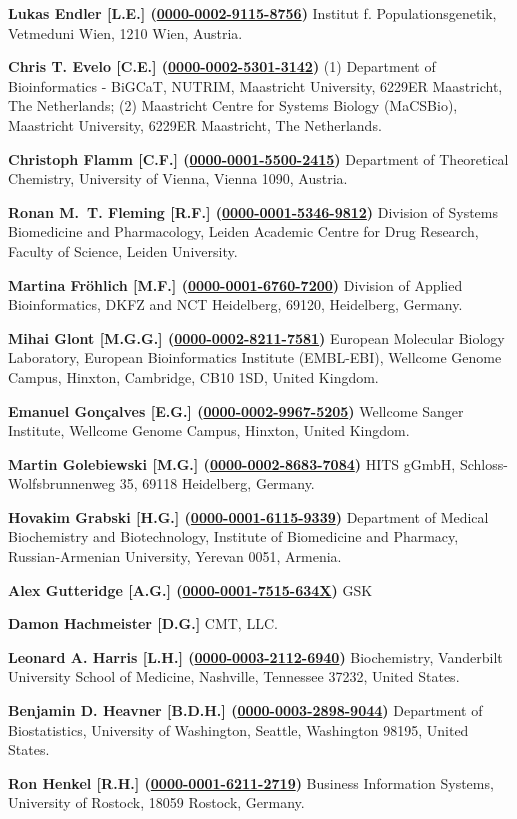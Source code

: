 \documentclass{sbml-paper}
\newcommand{\orcid}[1]{\href{https://orcid.org/#1}{#1}}
\begin{document}
\textbf{Lukas Endler [L.E.] (\orcid{0000-0002-9115-8756})} Institut f. Populationsgenetik, Vetmeduni  Wien, 1210 Wien, Austria.

\textbf{Chris T. Evelo [C.E.] (\orcid{0000-0002-5301-3142})} (1) Department of Bioinformatics - BiGCaT, NUTRIM, Maastricht University, 6229ER Maastricht, The Netherlands; (2) Maastricht Centre for Systems Biology (MaCSBio), Maastricht University, 6229ER Maastricht, The Netherlands.

\textbf{Christoph Flamm [C.F.] (\orcid{0000-0001-5500-2415})} Department of Theoretical Chemistry, University of Vienna, Vienna 1090, Austria.

\textbf{Ronan M.~T. Fleming [R.F.] (\orcid{0000-0001-5346-9812})} Division of Systems Biomedicine and Pharmacology, Leiden Academic Centre for Drug Research, Faculty of Science, Leiden University.

\textbf{Martina Fröhlich [M.F.] (\orcid{0000-0001-6760-7200})} Division of Applied Bioinformatics, DKFZ and NCT Heidelberg, 69120, Heidelberg, Germany.

\textbf{Mihai Glont [M.G.G.] (\orcid{0000-0002-8211-7581})} European Molecular Biology Laboratory, European Bioinformatics Institute (EMBL-EBI), Wellcome Genome Campus, Hinxton, Cambridge, CB10 1SD, United Kingdom.

\textbf{Emanuel Gonçalves [E.G.] (\orcid{0000-0002-9967-5205})} Wellcome Sanger Institute, Wellcome Genome Campus, Hinxton, United Kingdom.

\textbf{Martin Golebiewski [M.G.] (\orcid{0000-0002-8683-7084})} HITS gGmbH, Schloss-Wolfsbrunnenweg 35, 69118 Heidelberg, Germany.

\textbf{Hovakim Grabski [H.G.] (\orcid{0000-0001-6115-9339})} Department of Medical Biochemistry and Biotechnology, Institute of Biomedicine and Pharmacy, Russian-Armenian University, Yerevan 0051, Armenia.

\textbf{Alex Gutteridge [A.G.] (\orcid{0000-0001-7515-634X})} GSK

\textbf{Damon Hachmeister [D.G.]} CMT, LLC.

\textbf{Leonard A. Harris [L.H.] (\orcid{0000-0003-2112-6940})} Biochemistry, Vanderbilt University School of Medicine, Nashville, Tennessee 37232, United States.

\textbf{Benjamin D. Heavner [B.D.H.] (\orcid{0000-0003-2898-9044})} Department of Biostatistics, University of Washington, Seattle, Washington 98195, United States.

\textbf{Ron Henkel [R.H.] (\orcid{0000-0001-6211-2719})} Business Information Systems, University of Rostock, 18059 Rostock, Germany.
\end{document}
